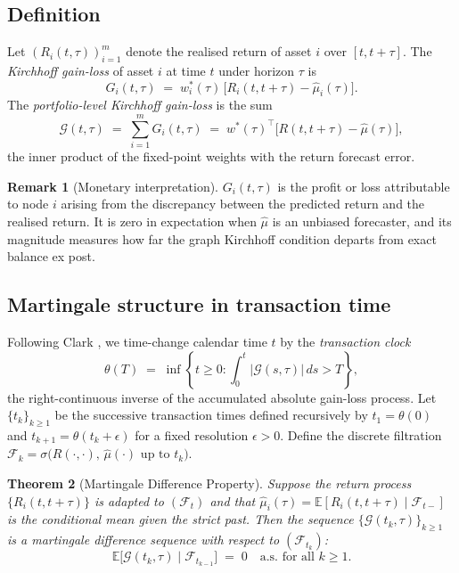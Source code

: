 \documentclass[twocolumn,11pt,a4paper]{article}
\theoremstyle{plain}
\newtheorem{theorem}{Theorem}[section]
\theoremstyle{definition}
\newtheorem{remark}[theorem]{Remark}
\theoremstyle{remark}
\newcommand{\E}{\mathbb{E}}
\newcommand{\F}{\mathcal{F}}
\newcommand{\wstar}{w^{*}}
\newcommand{\abs}[1]{\left|#1\right|}
\newcommand{\Gain}{\mathcal{G}}
\begin{document}
\subsection{Definition}
\label{sec:gainloss_def}

Let $(R_i(t,\tau))_{i=1}^m$ denote the realised return of asset $i$
over $[t,t+\tau]$.  The \emph{Kirchhoff gain-loss} of asset $i$ at
time $t$ under horizon $\tau$ is
\begin{equation}
  G_i(t,\tau) \;=\; w^*_i(\tau)\,\bigl[R_i(t,t+\tau)-\hat\mu_i(\tau)\bigr].
  \label{eq:gain_loss}
\end{equation}
The \emph{portfolio-level Kirchhoff gain-loss} is the sum
\begin{equation}
  \Gain(t,\tau) \;=\; \sum_{i=1}^m G_i(t,\tau)
  \;=\; \wstar(\tau)^{\top}\!\bigl[R(t,t+\tau)-\hat\mu(\tau)\bigr],
  \label{eq:total_gain}
\end{equation}
the inner product of the fixed-point weights with the return forecast
error.

\begin{remark}[Monetary interpretation]
  $G_i(t,\tau)$ is the profit or loss attributable to node $i$
  arising from the discrepancy between the predicted return and the
  realised return.  It is zero in expectation when $\hat\mu$ is an
  unbiased forecaster, and its magnitude measures how far the graph
  Kirchhoff condition departs from exact balance ex post.
\end{remark}

\subsection{Martingale structure in transaction time}
\label{sec:martingale}

Following Clark \cite{Clark1973}, we time-change calendar time $t$
by the \emph{transaction clock}
\begin{equation}
  \theta(T) \;=\; \inf\!\left\{t\ge 0:\int_0^t\abs{\Gain(s,\tau)}\,ds > T\right\},
  \label{eq:txclock}
\end{equation}
the right-continuous inverse of the accumulated absolute gain-loss
process.  Let $\{t_k\}_{k\ge 1}$ be the successive transaction times
defined recursively by $t_1=\theta(0)$ and $t_{k+1}=\theta(t_k+\epsilon)$
for a fixed resolution $\epsilon>0$.  Define the discrete filtration
$\F_k=\sigma\bigl(R(\cdot,\cdot),\,\hat\mu(\cdot)\text{ up to }t_k\bigr)$.

\begin{theorem}[Martingale Difference Property]
  \label{thm:martingale}
  Suppose the return process $\{R_i(t,t+\tau)\}$ is adapted to
  $(\F_t)$ and that $\hat\mu_i(\tau)=\E[R_i(t,t+\tau)\mid\F_{t-}]$
  is the conditional mean given the strict past.  Then the sequence
  $\{\Gain(t_k,\tau)\}_{k\ge 1}$ is a martingale difference sequence
  with respect to $(\F_{t_k})$:
  \begin{equation}
    \E\!\bigl[\Gain(t_k,\tau)\mid\F_{t_{k-1}}\bigr] \;=\; 0
    \quad\text{a.s.~for all }k\ge 1.
    \label{eq:mds}
  \end{equation}
\end{theorem}
\end{document}
